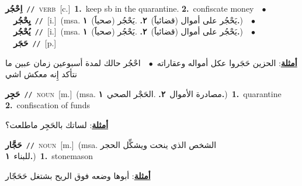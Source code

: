 \documentclass[10pt,a4paper,twoside]{article} %
\begin{document}
\begin{multicols}{2}
{{{{{{{{{{{\setlength\topsep{0pt}\textbf{\foreignlanguage{arabic}{اِحْجُر}}\ {\color{gray}\texttt{//}\color{black}}\ \textsc{verb}\ [c.]\ \textbf{1.}~keep sb in the quarantine.  \textbf{2.}~confiscate money\ \ $\bullet$\ \ \setlength\topsep{0pt}\textbf{\foreignlanguage{arabic}{يِحْجُر}}\ {\color{gray}\texttt{//}\color{black}}\ [i.]\ \color{gray}(msa. \foreignlanguage{arabic}{يَحْجُر على أموال (قضائياََ)}~\foreignlanguage{arabic}{\textbf{٢.}}  .\foreignlanguage{arabic}{يَحْجُر (صحياََ)}~\foreignlanguage{arabic}{\textbf{١.}})\color{black}\ \ $\bullet$\ \ \setlength\topsep{0pt}\textbf{\foreignlanguage{arabic}{يُحْجُر}}\ {\color{gray}\texttt{//}\color{black}}\ [i.]\ \color{gray}(msa. \foreignlanguage{arabic}{يَحْجُر على أموال (قضائياََ)}~\foreignlanguage{arabic}{\textbf{٢.}}  .\foreignlanguage{arabic}{يَحْجُر (صحياََ)}~\foreignlanguage{arabic}{\textbf{١.}})\color{black}\ \ $\bullet$\ \ \setlength\topsep{0pt}\textbf{\foreignlanguage{arabic}{حَجَر}}\ {\color{gray}\texttt{//}\color{black}}\ [p.]\  \begin{flushright}\color{gray}\foreignlanguage{arabic}{\textbf{\underline{\foreignlanguage{arabic}{أمثلة}}}: الحزين حَجَروا عكل أمواله وعقاراته\ $\bullet$\ \  احْجُر حالك لمدة أسبوعين زمان عبين ما نتأكد إِنه معكش اشي}\end{flushright}\color{black}} \vspace{2mm}

{\setlength\topsep{0pt}\textbf{\foreignlanguage{arabic}{حَجِر}}\ {\color{gray}\texttt{//}\color{black}}\ \textsc{noun}\ [m.]\ \color{gray}(msa. \foreignlanguage{arabic}{مصادرة الأموال}~\foreignlanguage{arabic}{\textbf{٢.}}  .\foreignlanguage{arabic}{الحَجْر الصحي}~\foreignlanguage{arabic}{\textbf{١.}})\color{black}\ \textbf{1.}~quarantine  \textbf{2.}~confiscation of funds\  \begin{flushright}\color{gray}\foreignlanguage{arabic}{\textbf{\underline{\foreignlanguage{arabic}{أمثلة}}}: لساتك بالحَجِر ماطلعت؟}\end{flushright}\color{black}} \vspace{2mm}

{\setlength\topsep{0pt}\textbf{\foreignlanguage{arabic}{حَجَّار}}\ {\color{gray}\texttt{//}\color{black}}\ \textsc{noun}\ [m.]\ \color{gray}(msa. \foreignlanguage{arabic}{الشخص الذي ينحت ويشكِّل الحجر للبناء}~\foreignlanguage{arabic}{\textbf{١.}})\color{black}\ \textbf{1.}~stonemason\  \begin{flushright}\color{gray}\foreignlanguage{arabic}{\textbf{\underline{\foreignlanguage{arabic}{أمثلة}}}: أبوها وضعه فوق الريح بشتغل حَحَجّار}\end{flushright}\color{black}} \vspace{2mm}

}}}}}}}}}}
\end{multicols}
\end{document}
